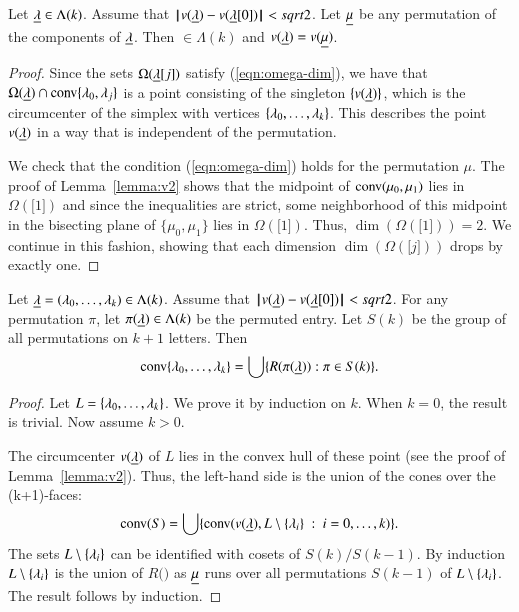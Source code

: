 \begin{lemma}   Let ${\underline{\lambda}}\in\Lambda(k)$.  Assume that ${\hskip0.1em|\hskip-0.15em|\hskip0.1em}v({\underline{\lambda}}) - v({\underline{\lambda}}[0]){\hskip0.1em|\hskip-0.15em|\hskip0.1em}<sqrt2$.
Let ${\underline{\mu}}$ be any permutation of the components of ${\underline{\lambda}}$.  Then $\bm\in\Lambda(k)$ and
 $v({\underline{\lambda}}) = v({\underline{\mu}})$.
\end{lemma}

\begin{proof} 
Since the sets $\Omega({\underline{\lambda}}[j])$ satisfy (\ref{eqn:omega-dim}), we have that
$\Omega({\underline{\lambda}})\cap {\operatorname{conv}}\{\lambda_0,\lambda_j\}$ is a point consisting of the singleton $\{v({\underline{\lambda}})\}$, which is the
circumcenter of the simplex with vertices $\{\lambda_0,\ldots,\lambda_k\}$.  This describes
the point $v({\underline{\lambda}})$ in a way that is independent of the permutation.

We check that the condition (\ref{eqn:omega-dim}) holds for the permutation $\mu$.
The proof of Lemma~\ref{lemma:v2} shows that the midpoint of ${\operatorname{conv}}(\mu_0,\mu_1)$
lies in $\Omega(\bm[1])$ and since the inequalities are strict, some neighborhood
of this midpoint in the bisecting plane of $\{\mu_0,\mu_1\}$ lies in $\Omega(\bm[1])$.
Thus, $\dim(\Omega(\bm[1]))=2$.  We continue in this fashion, showing that each dimension
$\dim(\Omega(\bm[j]))$ drops by exactly one.
\end{proof}

\begin{lemma}\label{lemma:Rconv} Let ${\underline{\lambda}} = (\lambda_0,\ldots,\lambda_k)\in\Lambda(k)$.  Assume that ${\hskip0.1em|\hskip-0.15em|\hskip0.1em}v({\underline{\lambda}}) - v({\underline{\lambda}}[0]){\hskip0.1em|\hskip-0.15em|\hskip0.1em}<sqrt2$.
For any permutation $\pi$, let $\pi({\underline{\lambda}})\in\Lambda(k)$ be the permuted entry.  Let
$S(k)$ be the group of all permutations on $k+1$ letters.   Then
$$
{\operatorname{conv}}\{\lambda_0,\ldots,\lambda_k\} = \bigcup \{ R(\pi({\underline{\lambda}})) : \pi\in S(k)\}.
$$
\end{lemma}

\begin{proof} Let $L = \{\lambda_0,\ldots,\lambda_k\}$.  We prove it by induction on $k$.
When $k=0$, the result is trivial.  Now assume $k>0$.

The circumcenter $v({\underline{\lambda}})$ of $L$ lies in the convex hull of these
point (see the proof of Lemma~\ref{lemma:v2}).  Thus, the left-hand side is the union
of the cones over the (k+1)-faces:
$$
{\operatorname{conv}}(S) = \bigcup\{ {\operatorname{conv}}(v({\underline{\lambda}}),L\setminus \{\lambda_i\}\ :\  i=0,\ldots,k) \}.
$$
The sets $L\setminus \{\lambda_i\}$ can be identified with  cosets of $S(k)/S(k-1)$.
By induction $L\setminus \{\lambda_i\}$ is the union of $R(\bm)$ as ${\underline{\mu}}$ runs
over all permutations $S(k-1)$ of $L\setminus \{\lambda_i\}$.
The result follows by induction.
\end{proof}

